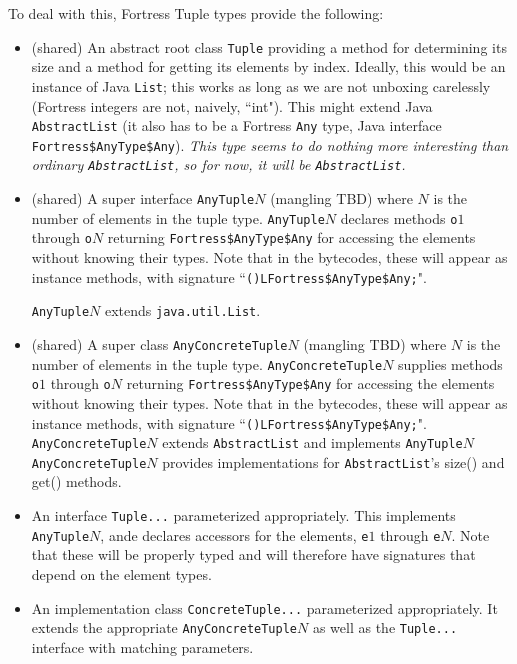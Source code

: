 \documentclass[11pt]{article}
\begin{document}
To deal with this, Fortress Tuple types provide the following:
\begin{itemize}

\item (shared) An abstract root class \verb+Tuple+ providing a method for determining its size and a method for getting its elements by index.  Ideally, this would be an instance of Java \verb+List+; this works as long as we are not unboxing carelessly (Fortress integers are not, naively, ``int").  This might extend Java \verb+AbstractList+ (it also has to be a Fortress \verb+Any+ type, Java interface \verb+Fortress$AnyType$Any+).  {\it This type seems to do nothing more interesting than ordinary \verb+AbstractList+, so for now, it will be \verb+AbstractList+.}

\item (shared) A super interface \verb+AnyTuple+$N$ (mangling TBD) where $N$ is the number of elements in the tuple type.  \verb+AnyTuple+$N$ declares methods \verb+o+$1$ through \verb+o+$N$ returning \verb+Fortress$AnyType$Any+ for accessing the elements without knowing their types.  Note that in the bytecodes, these will appear as instance methods, with signature ``\verb+()LFortress$AnyType$Any;+".

\verb+AnyTuple+$N$ extends \verb+java.util.List+.

\item (shared) A super class \verb+AnyConcreteTuple+$N$ (mangling TBD) where $N$ is the number of elements in the tuple type.
\verb+AnyConcreteTuple+$N$ supplies methods \verb+o+$1$ through \verb+o+$N$ returning \verb+Fortress$AnyType$Any+ for accessing the elements without knowing their types.
Note that in the bytecodes, these will appear as instance methods, with signature ``\verb+()LFortress$AnyType$Any;+".
\verb+AnyConcreteTuple+$N$ extends \verb+AbstractList+ and implements \verb+AnyTuple+$N$
\verb+AnyConcreteTuple+$N$ provides implementations for \verb+AbstractList+'s size() and get() methods.

\item An interface \verb+Tuple...+ parameterized appropriately.  This implements \verb+AnyTuple+$N$, ande declares
accessors for the elements, \verb+e+$1$ through \verb+e+$N$.  Note that these will be properly typed and will therefore have signatures that depend on the element types.

\item An implementation class \verb+ConcreteTuple...+ parameterized appropriately.
It extends the appropriate \verb+AnyConcreteTuple+$N$ as well as the \verb+Tuple...+ interface with matching parameters.


\end{itemize}
\end{document}
